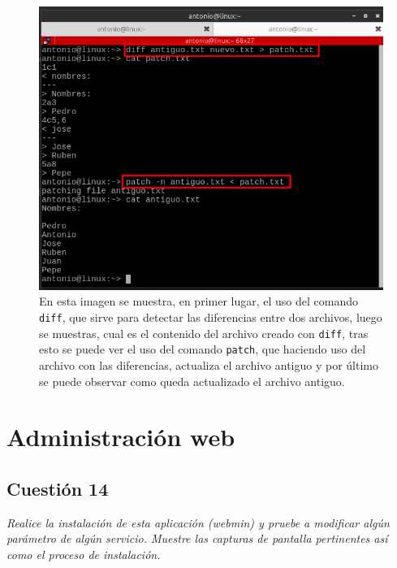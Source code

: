 \begin{figure}[H]
    \begin{center}
        \includegraphics[scale=0.5]{imagenes/img62}
        \caption{En esta imagen se muestra, en primer lugar, el uso del comando \texttt{diff}, que sirve para detectar las diferencias entre dos archivos, luego se muestras, cual es el contenido del archivo creado con \texttt{diff}, tras esto se puede ver el uso del comando \texttt{patch}, que haciendo uso del archivo con las diferencias, actualiza el archivo antiguo y por último se puede observar como queda actualizado el archivo antiguo.}
        \label{fig61}
    \end{center}
\end{figure}

\section{Administración web}
\subsection{Cuestión 14}
\textit{Realice la instalación de esta aplicación (webmin) y pruebe a modificar algún parámetro de algún servicio. Muestre las capturas de pantalla pertinentes así como el proceso de instalación.}
\newline

